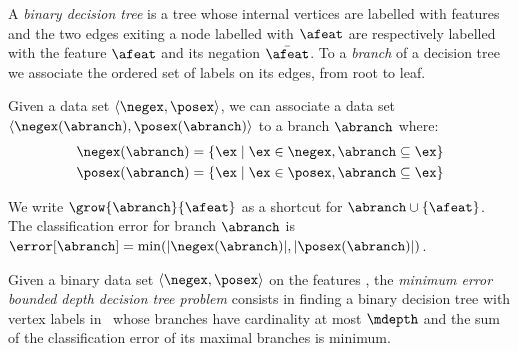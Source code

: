 \documentclass{llncs}
\begin{document}
A \emph{binary decision tree} is a tree whose 
internal vertices are labelled with features and the two edges exiting a node labelled with $\afeat$ are respectively labelled with the feature $\afeat$ and its negation $\bar{\afeat}$.
To a \emph{branch} of a decision tree we associate the ordered set of labels on its edges, from root to leaf.



 
Given a data set $\langle \negex,\posex \rangle$, we can associate a data set $\langle \negex(\abranch),\posex(\abranch) \rangle$ to a branch $\abranch$ where:
\begin{eqnarray*}
\negex(\abranch) = \{\ex \mid \ex \in \negex, \abranch \subseteq \ex\}\\
\posex(\abranch) = \{\ex \mid \ex \in \posex, \abranch \subseteq \ex\}
\end{eqnarray*}


We write $\grow{\abranch}{\afeat}$ as a shortcut for $\abranch \cup \{\afeat\}$.
The classification error for branch $\abranch$ is $\error[\abranch]=\min(|\negex(\abranch)|, |\posex(\abranch)|)$.

\medskip

Given a binary data set $\langle \negex,\posex \rangle$ on the features \features, %
the \emph{minimum error bounded depth decision tree problem} consists in finding a binary decision tree with vertex labels in \features\ whose branches have cardinality at most $\mdepth$ and the sum of the classification error %
of its maximal branches is minimum.
\end{document}
